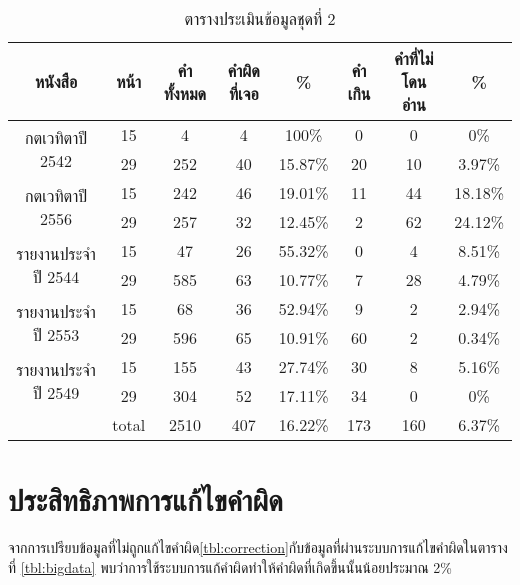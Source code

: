 \begin{table}[H]
    \caption{ตารางประเมินข้อมูลชุดที่ 2}\label{tbl:smalldata}
    \begin{tabular}{|c|c|c|c|c|c|c|c|}
        \hline
        หนังสือ                             & หน้า  & คำทั้งหมด & คำผิดที่เจอ & \%    & คำเกิน & คำที่ไม่โดนอ่าน & \%    \\ \hline
        \multirow{2}{*}{กตเวทิตาปี 2542}    & 15    & 4         & 4           & 100\%   & 0      & 0               & 0\%     \\ \cline{2-8} 
                                            & 29    & 252       & 40          & 15.87\% & 20     & 10              & 3.97\%  \\ \hline
        \multirow{2}{*}{กตเวทิตาปี 2556}    & 15    & 242       & 46          & 19.01\% & 11     & 44              & 18.18\% \\ \cline{2-8} 
                                            & 29    & 257       & 32          & 12.45\% & 2      & 62              & 24.12\% \\ \hline
        \multirow{2}{*}{รายงานประจำปี 2544} & 15    & 47        & 26          & 55.32\% & 0      & 4               & 8.51\%  \\ \cline{2-8} 
                                            & 29    & 585       & 63          & 10.77\% & 7      & 28              & 4.79\%  \\ \hline
        \multirow{2}{*}{รายงานประจำปี 2553} & 15    & 68        & 36          & 52.94\% & 9      & 2               & 2.94\%  \\ \cline{2-8} 
                                            & 29    & 596       & 65          & 10.91\% & 60     & 2               & 0.34\%  \\ \hline
        \multirow{2}{*}{รายงานประจำปี 2549} & 15    & 155       & 43          & 27.74\% & 30     & 8               & 5.16\%  \\ \cline{2-8} 
                                            & 29    & 304       & 52          & 17.11\% & 34     & 0               & 0\%     \\ \hline
                                            & total & 2510      & 407         & 16.22\% & 173    & 160             & 6.37\%  \\ \hline
        \end{tabular}
        \end{table}

\section{ประสิทธิภาพการแก้ไขคำผิด}
จากการเปรียบข้อมูลที่ไม่ถูกแก้ไขคำผิด\ref{tbl:correction}กับข้อมูลที่ผ่านระบบการแก้ไขคำผิดในตารางที่ \ref{tbl:bigdata} พบว่าการใช้ระบบการแก้คำผิดทำให้คำผิดที่เกิดขึ้นนั้นน้อยประมาณ 2\%

